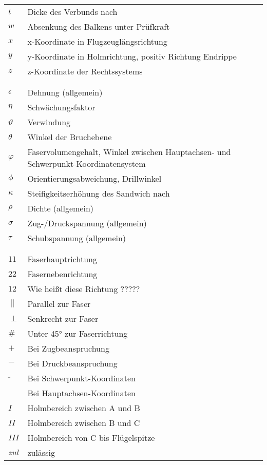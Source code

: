 \begin{longtable}{ll}
$ t $&Dicke des Verbunds nach \cite{item3}\\
$ w $&Absenkung des Balkens unter Prüfkraft\\
$ x $&x-Koordinate in Flugzeuglängsrichtung\\
$ y $&y-Koordinate in Holmrichtung, positiv Richtung Endrippe\\
$ z $&z-Koordinate der Rechtssystems\\
& \\
& \\
$ \epsilon $&Dehnung (allgemein)\\
$ \eta $&Schwächungsfaktor\\
$ \vartheta $&Verwindung\\
$ \theta $ &Winkel der Bruchebene\\
$ \varphi $&Faservolumengehalt, Winkel zwischen Hauptachsen- und Schwerpunkt-Koordinatensystem\\
$ \phi $&Orientierungsabweichung, Drillwinkel\\
$ \kappa $&Steifigkeitserhöhung des Sandwich nach \cite{item1}\\
$ \rho $&Dichte (allgemein)\\
$ \sigma $&Zug-/Druckspannung (allgemein)\\
$ \tau $&Schubspannung (allgemein)\\
& \\
& \\
$ 11 $&Faserhauptrichtung\\
$ 22 $&Fasernebenrichtung\\
$ 12 $&Wie heißt diese Richtung ?????\\
$ \parallel $&Parallel zur Faser\\
$ \perp $&Senkrecht zur Faser\\
$ \# $&Unter 45° zur Faserrichtung\\
$ + $&Bei Zugbeanspruchung\\
$ - $&Bei Druckbeanspruchung\\
$ \bar{ } $&Bei Schwerpunkt-Koordinaten\\
$ \hat{ } $&Bei Hauptachsen-Koordinaten\\
$ I $ &Holmbereich zwischen A und B\\
$ II $ &Holmbereich zwischen B und C\\
$ III $ &Holmbereich von C bis Flügelspitze\\
$ zul $&zulässig
\end{longtable}


